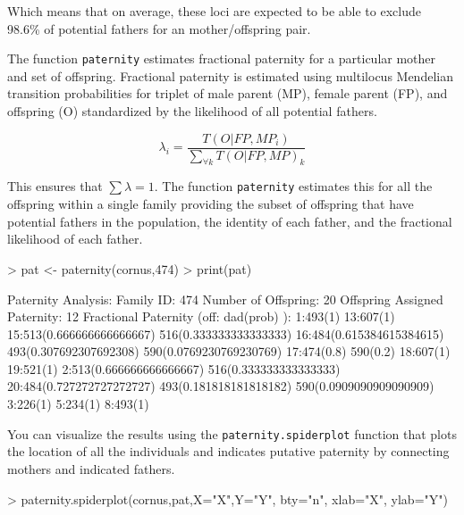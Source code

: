 \documentclass[letterpaper,twoside,openany]{book}
\begin{document}
Which means that on average, these loci are expected to be able to exclude 98.6\% of potential fathers for an mother/offspring pair.  

The function \texttt{paternity} estimates fractional paternity for a particular mother and set of offspring.  Fractional paternity is estimated using multilocus Mendelian transition probabilities for triplet of male parent (MP), female parent (FP), and offspring (O) standardized by the likelihood of all potential fathers.   

\[
\lambda_i = \frac{T(O|FP,MP_i)}{\sum_{\forall k}T(O|FP,MP)_k}
\]

This ensures that $\sum \lambda = 1$.  The function \texttt{paternity} estimates this for all the offspring within a single family providing the subset of offspring that have potential fathers in the population, the identity of each father, and the fractional likelihood of each father.

\begin{Schunk}
\begin{Sinput}
> pat <- paternity(cornus,474)
> print(pat)
\end{Sinput}
\begin{Soutput}
Paternity Analysis:
  Family ID: 474 
  Number of Offspring: 20 
  Offspring Assigned Paternity: 12 
  Fractional Paternity (off: dad(prob) ):
    1:493(1)  
    13:607(1)  
    15:513(0.666666666666667) 516(0.333333333333333)  
    16:484(0.615384615384615) 493(0.307692307692308) 590(0.0769230769230769)  
    17:474(0.8) 590(0.2)  
    18:607(1)  
    19:521(1)  
    2:513(0.666666666666667) 516(0.333333333333333)  
    20:484(0.727272727272727) 493(0.181818181818182) 590(0.0909090909090909)  
    3:226(1)  
    5:234(1)  
    8:493(1)  
\end{Soutput}
\end{Schunk}


You can visualize the results using the \texttt{paternity.spiderplot} function that plots the location of all the individuals and indicates putative paternity by connecting mothers and indicated fathers.

\begin{Schunk}
\begin{Sinput}
> paternity.spiderplot(cornus,pat,X="X",Y="Y", bty="n", xlab="X", ylab="Y")
\end{Sinput}
\end{Schunk}
\end{document}
